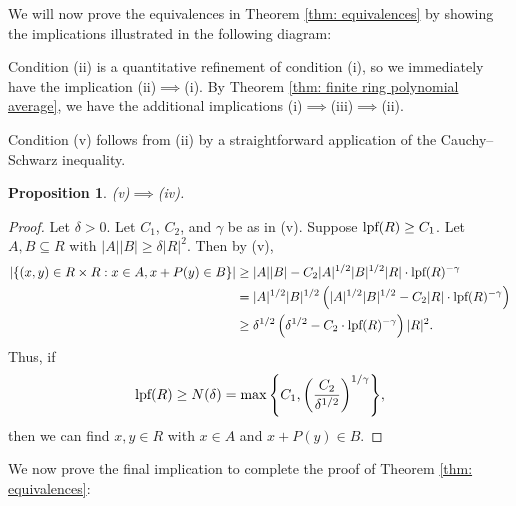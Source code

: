 \documentclass{amsart}
\newtheorem{proposition}[theorem]{Proposition}
\theoremstyle{definition}
\numberwithin{equation}{section}
\newcommand{\lpf}{\normalfont\text{lpf}}
\begin{document}
We will now prove the equivalences in Theorem \ref{thm: equivalences}
by showing the implications illustrated in the following diagram:

\begin{center}
\end{center}

Condition (ii) is a quantitative refinement of condition (i), so we immediately have the implication (ii)$\implies$(i).
By Theorem \ref{thm: finite ring polynomial average}, we have the additional implications (i)$\implies$(iii)$\implies$(ii).

Condition (v) follows from (ii) by a straightforward application of the Cauchy--Schwarz inequality.

\begin{proposition} \label{prop: v,iv}
	(v)$\implies$(iv).
\end{proposition}
\begin{proof}
	Let $\delta > 0$.
	Let $C_1$, $C_2$, and $\gamma$ be as in (v).
	Suppose $\lpf(R) \ge C_1$.
	Let $A, B \subseteq R$ with $|A| |B| \ge \delta |R|^2$.
	Then by (v),
	\begin{align*}
		\left| \left\{ (x,y) \in R \times R : x \in A, x + P(y) \in B \right\} \right|
		 & \ge |A| |B| - C_2 |A|^{1/2} |B|^{1/2} |R| \cdot \lpf(R)^{-\gamma} \\
		 & = |A|^{1/2} |B|^{1/2} \left( |A|^{1/2} |B|^{1/2} - C_2 |R| \cdot \lpf(R)^{-\gamma} \right) \\
		 & \ge \delta^{1/2} \left( \delta^{1/2} - C_2 \cdot \lpf(R)^{-\gamma} \right) |R|^2.
	\end{align*}
	Thus, if
	\begin{align*}
		\lpf(R) \ge N(\delta) = \max{\left\{C_1, \left( \frac{C_2}{\delta^{1/2}} \right)^{1/\gamma} \right\}},
	\end{align*}
	then we can find $x, y \in R$ with $x \in A$ and $x + P(y) \in B$.
\end{proof}

We now prove the final implication to complete the proof of Theorem \ref{thm: equivalences}:
\end{document}
